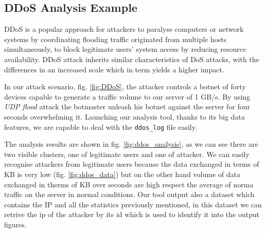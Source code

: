 \subsection{DDoS Analysis Example}
DDoS is a popular approach for attackers to paralyse computers or network systems by coordinating flooding traffic originated from multiple hosts simultaneously, to block legitimate users' system access by reducing resource availability. DDoS attack inherits similar characteristics of DoS attacks, with the differences in an increased scale which in term yields a higher impact\cite{ddos_forensics}.

In our attack scenario, fig. \ref{fig:DDoS},  the attacker controls a botnet of forty devices capable to generate a traffic volume to our server of 1 GB/s. By using \textit{UDP flood} attack the botmaster unleash his botnet against the server for four seconds overwhelming it. Launching our analysis tool, thanks to its big data features, we are capable to deal with the \texttt{ddos\_log} file easily.

The analysis results are shown in fig. \ref{fig:ddos_analysis}, as we can see there are two  visible clusters, one of legitimate users and one of attacker. We can easily recognise attackers from legitimate users because the data exchanged in terms of KB is very low (fig. \ref{fig:ddos_data}) but on the other hand volume of data exchanged in therms of KB over seconds are high respect the average of norma traffic on the server in normal conditions. Our tool output also a dataset which contains the IP and all the statistics previously mentioned, in this dataset we can retrive the ip of the attacker by its id which is used to identify it into the output figures. 







